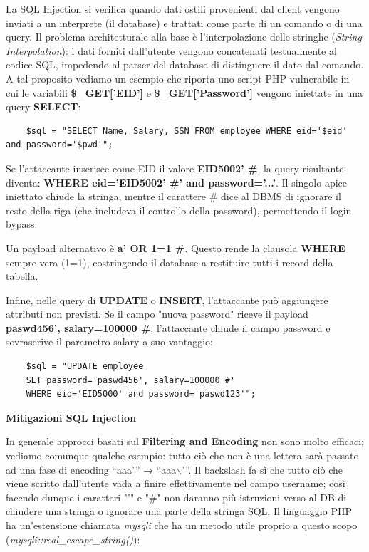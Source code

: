 La SQL Injection si verifica quando dati ostili provenienti dal client 
vengono inviati a un interprete (il database) e trattati come parte di un 
comando o di una query. Il problema architetturale alla base è 
l'interpolazione delle stringhe (\textit{String Interpolation}): i dati 
forniti dall'utente vengono concatenati testualmente al codice SQL, 
impedendo al parser del database di distinguere il dato dal comando. A tal 
proposito vediamo un esempio che riporta uno script PHP vulnerabile in cui
le variabili \textbf{\$\_GET['EID']} e \textbf{\$\_GET['Password']} vengono
iniettate in una query \textbf{SELECT}:

\begin{lstlisting}
    $sql = "SELECT Name, Salary, SSN FROM employee WHERE eid='$eid' and password='$pwd'";
\end{lstlisting}

Se l'attaccante inserisce come EID il valore \textbf{EID5002' \#}, la query risultante 
diventa: \textbf{WHERE eid='EID5002' \#' and password='...'}. Il singolo apice 
iniettato chiude la stringa, mentre il carattere \# dice al DBMS di ignorare 
il resto della riga (che includeva il controllo della password), permettendo 
il login bypass.

Un payload alternativo è \textbf{a' OR 1=1 \#}. Questo rende la clausola \textbf{WHERE} 
sempre vera (1=1), costringendo il database a restituire tutti i record 
della tabella.

Infine, nelle query di \textbf{UPDATE} o \textbf{INSERT}, l'attaccante 
può aggiungere attributi non previsti. Se il campo "nuova password" riceve 
il payload \textbf{paswd456', salary=100000 \#}, l'attaccante chiude il 
campo password e sovrascrive il parametro salary a suo vantaggio:

\begin{lstlisting}
    $sql = "UPDATE employee
    SET password='paswd456', salary=100000 #'
    WHERE eid='EID5000' and password='paswd123'";
\end{lstlisting}

\textbf{Mitigazioni SQL Injection}

In generale approcci basati sul \textbf{Filtering and Encoding} non sono molto efficaci; 
vediamo comunque qualche esempio: tutto ciò che non è una lettera sarà 
passato ad una fase di encoding “aaa'” → “aaa$\backslash$'”. Il backslash fa 
sì che tutto ciò che viene scritto dall'utente vada a finire effettivamente 
nel campo username; così facendo dunque i caratteri "'" e "\#" non daranno più
istruzioni verso al DB di chiudere una stringa o ignorare una parte della 
stringa SQL. Il linguaggio PHP ha un'estensione chiamata \textit{mysqli} che
ha un metodo utile proprio a questo scopo (\textit{mysqli::real\_escape\_string()}):

